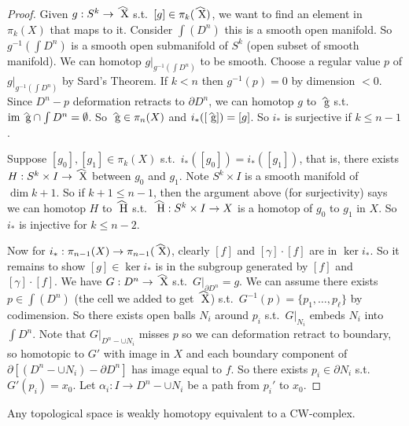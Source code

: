 \documentclass[12pt,class=article,crop=false]{standalone}
\begin{document}
\begin{proof}
	Given $ g: S^{k} \to \wh{ X}$ s.t.\ $ [g] \in \pi_k(\wh{ X})$, we want to find an element in $ \pi_k(X)$ that maps to it. Consider $ \int(D^{n})$ this is a smooth open manifold. So $ g^{-1}(\int D^{n})$ is a smooth open submanifold of $ S^{k}$ (open subset of smooth manifold). We can homotop $ g|_{g^{-1}(\int D^{n})}$ to be smooth. Choose a regular value $ p$ of  $ g|_{g^{-1}(\int D^{n})}$ by Sard's Theorem. If $ k<n$ then  $ g^{-1}(p) = 0$ by dimension $ <0$. Since $ D^{n} - p$ deformation retracts to $ \partial D^{n}$, we can homotop $ g$ to $ \wh{ g}$ s.t.\ $ \im \wh{ g} \cap \int D^{n} = \O$. So $ \wh{ g} \in \pi_n(X)$ and $ i_*([\wh{ g}]) = [g]$. So $ i_*$ is surjective if  $ k \leq n-1$.

	Suppose  $ [g_0],[g_1] \in \pi_k(X)$ s.t.\ $ i_*([g_0]) = i_*([g_1])$, that is, there exists $ H: S^{k} \times I \to \wh{ X}$ between $  g_0$ and $ g_1$. Note $ S^{k} \times I$ is a smooth manifold of $ \dim k+1$. So if  $ k+1 \leq n-1$, then the argument above (for surjectivity) says we can homotop  $ H$ to  $ \wh{ H}$ s.t.\ $ \wh{ H}: S^{k} \times I \to X$ is a homotop of $ g_0$ to $ g_1$ in $ X$. So  $ i_*$ is injective for  $ k \leq n-2$. 

	Now for $ i_*: \pi_{n-1}(X) \to \pi_{n-1}(\wh{ X})$, clearly $ [f]$ and  $ [ \gamma] \cdot [f]$ are in $ \ker i_*$. So it remains to show $ [g] \in \ker i_*$ is in the subgroup generated by $ [f]$ and  $ [ \gamma] \cdot [f]$. We have $ G: D^{n} \to \wh{ X}$ s.t.\ $ G|_{\partial D^{n}} =g$. We can assume there exists $ p \in \int(D^{n})$ (the cell we added to get $ \wh{ X}$) s.t.\ $ G^{-1}(p) = \{p_1,\ldots,p_\ell\} $ by codimension. So there exists open balls $ N_i$ around $ p_i$ s.t.\ $ G|_{N_i}$ embeds $ N_i$ into $ \int D^{n}$. Note that $ G|_{D^{n} - \cup N_i}$ misses $ p$ so we can deformation retract to boundary, so homotopic to  $ G'$ with image in  $ X$ and each boundary component of  $ \partial [(D^{n}- \cup N_i)-\partial D^{n}]$ has image equal to $ f$. So there exists  $ p_i \in \partial N_i$ s.t.\ $ G'(p_i)=x_0$. Let $ \alpha_i: I \to D^{n}-\cup N_i$ be a path from $ p_i'$ to  $ x_0$.
\end{proof}

\begin{thm}
Any topological space is weakly homotopy equivalent to a CW-complex.
\end{thm}
\end{document}
